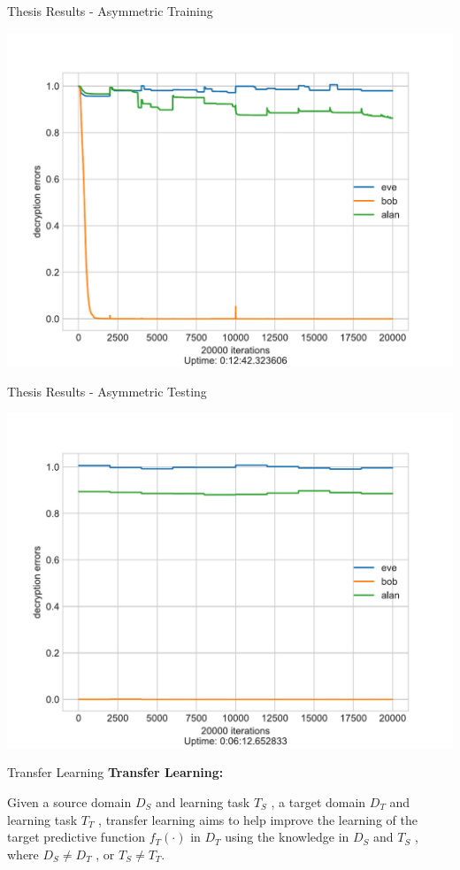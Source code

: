 \documentclass{beamer}
\begin{document}
		\begin{frame}{Thesis Results - Asymmetric Training}
			\begin{center}
				\includegraphics[height=0.9\textheight]{neurencoder-asymmetric-training}
			\end{center}
		\end{frame}
		\begin{frame}{Thesis Results - Asymmetric Testing}
			\begin{center}
				\includegraphics[height=0.9\textheight]{neurencoder-asymmetric-testing}
			\end{center}
		\end{frame}
		\begin{frame}{Transfer Learning}
			\textbf{Transfer Learning:}\\
			{\centering
				Given a source domain $ D_{S} $ and learning task $ T_{S} $ , a target domain $ D_{T} $ and learning task
				$ T_{T} $ , transfer learning aims to help improve the learning of the
				target predictive function $ f_{T}(\cdot) $ in $ D_{T} $ using the knowledge in
				$ D_{S} $ and $ T_{S} $ , where $ D_{S} \neq D_{T} $ , or $ T_{S} \neq T_{T} $.~\citep{5288526}
				\par} 
		\end{frame}
\end{document}
